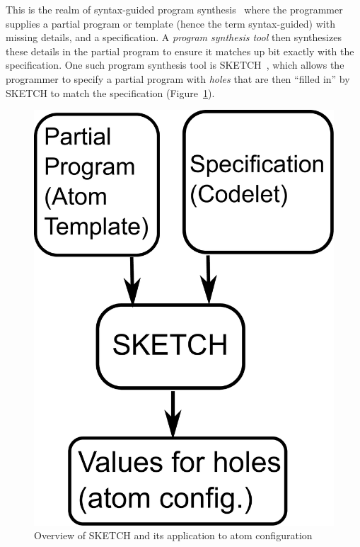 This is the realm of syntax-guided program synthesis~\cite{sgsyn} where the
programmer supplies a partial program or template (hence the term
syntax-guided) with missing details, and a specification. A \textit{program synthesis
tool} then synthesizes these details in the partial program to ensure it matches
up bit exactly with the specification. One such program synthesis tool is
SKETCH~\cite{bitstreaming, sketch_asplos, sketch_manual}, which allows the
programmer to specify a partial program with \textit{holes} that are then
``filled in'' by SKETCH to match the specification
(Figure~\ref{fig:sketch}).

\begin{figure}[!b]
  \begin{center}
  \includegraphics[width=0.4\columnwidth]{sketch.pdf}
  \caption{Overview of SKETCH and its application to atom configuration}
  \label{fig:sketch}
  \end{center}
\end{figure}

